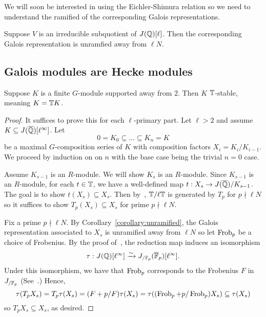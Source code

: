 \documentclass{article}
\begin{document}
We will soon be interested in using the Eichler-Shimura relation so we need to
understand the ramified of the corresponding Galois representations.
\begin{corollary}\label{corollary:unramified}
    Suppose $V$ is an irreducible subquotient of $J(\mathbb{Q})[\ell]$. Then the
    corresponding Galois representation is unramfied away from $\ell N$.
\end{corollary}
 

\subsection{Galois modules are Hecke modules}

\begin{theorem}\label{theorem:G_modules_are_Hecke}
    Suppose $K$ is a finite $G$-module supported away from $2$. Then $K$
    $\mathbb{T}$-stable, meaning $K=\mathbb{T} K$.
\end{theorem}

\begin{proof}
    It suffices to prove this for each $\ell$-primary part. Let $\ell>2$ and
    assume $K\subseteq J(\overline{\mathbb{Q}})[\ell^\infty]$. Let
    \[
        0 = K_0 \subseteq \ldots \subseteq K_n = K
    \]
    be a maximal $G$-composition series of $K$ with composition factors $X_i =
    K_i/K_{i-1}$. We proceed by induction on on $n$ with the base
    case being the trivial $n=0$ case. 
    
    Assume $K_{s-1}$ is an $R$-module. We will show $K_s$ is an $R$-module.
    Since $K_{s-1}$ is an $R$-module, for each $t\in \mathbb{T}$, we have a
    well-defined map $t:X_s\to J(\overline{\mathbb{Q}})/K_{s-1}$. The goal is to show
    $t(X_s)\subseteq X_s$. Then by~\cite[Prop. 6.1]{MR1610883}, $\mathbb{T}/\ell \mathbb{T}$
    is generated by $T_p$ for $p\nmid \ell N$ so it suffices to show
    $T_p(X_s)\subseteq X_s$ for prime $p\nmid \ell N$.

    Fix a prime $p\nmid \ell N$. By Corollary~\ref{corollary:unramified}, the
    Galois representation associated to $X_s$ is unramified away from $\ell N$
    so let $\operatorname{Frob}_p$ be a choice of Frobenius. By the proof of~\cite[Lemma
    12.6.2]{ribet-stein:mod}, the reduction map induces an isomorphism
    \[
        \tau:J(\mathbb{Q})[\ell^\infty] \xrightarrow{\sim} J_{/\mathbb{F}_p} (\overline{\mathbb{F}}_p)[\ell^\infty].
    \]
    Under this isomorphism, we have that $\operatorname{Frob}_p$ corresponds to the Frobenius
    $F$ in $J_{/\mathbb{F}_p}$ (See~\cite[\S 5.3]{ribet-stein:serre}.) Hence,
    \[
    \tau(T_p X_s) 
    = T_p\tau(X_s) 
    = (F+p/F)\tau(X_s)
    = \tau((\operatorname{Frob}_p+p/\operatorname{Frob}_p)X_s)
    \subseteq \tau(X_s)
    \]
    so $T_p X_s\subseteq X_s$, as desired.
\end{proof}
\end{document}

